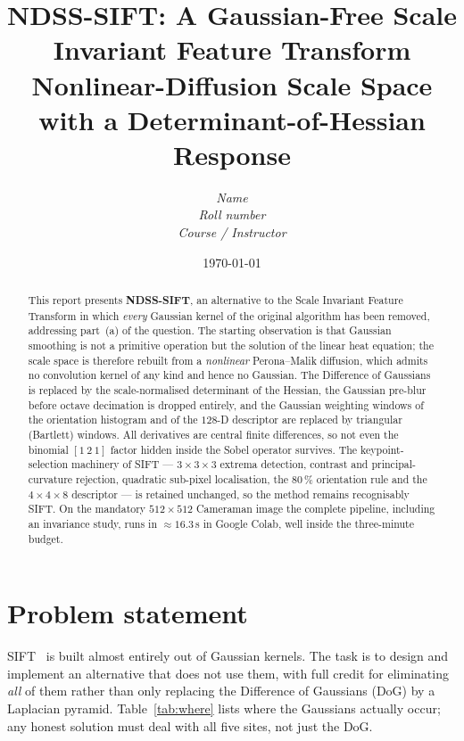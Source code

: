 \documentclass[11pt,a4paper]{article}
\title{\bfseries NDSS-SIFT: A Gaussian-Free Scale Invariant Feature Transform\\[2mm]
\large Nonlinear-Diffusion Scale Space with a Determinant-of-Hessian Response}
\author{\textit{Name} \\ \textit{Roll number} \\ \textit{Course / Instructor}}
\date{\today}
\newcommand{\Truntime}{16.3}      %
\begin{document}
\maketitle

\begin{abstract}
\noindent
This report presents \textbf{NDSS-SIFT}, an alternative to the Scale Invariant
Feature Transform in which \emph{every} Gaussian kernel of the original
algorithm has been removed, addressing part~(a) of the question. The starting
observation is that Gaussian smoothing is not a primitive operation but the
solution of the linear heat equation; the scale space is therefore rebuilt from
a \emph{nonlinear} Perona--Malik diffusion, which admits no convolution kernel
of any kind and hence no Gaussian. The Difference of Gaussians is replaced by
the scale-normalised determinant of the Hessian, the Gaussian pre-blur before
octave decimation is dropped entirely, and the Gaussian weighting windows of
the orientation histogram and of the $128$-D descriptor are replaced by
triangular (Bartlett) windows. All derivatives are central finite differences,
so not even the binomial $[1\ 2\ 1]$ factor hidden inside the Sobel operator
survives. The keypoint-selection machinery of SIFT --- $3\!\times\!3\!\times\!3$
extrema detection, contrast and principal-curvature rejection, quadratic
sub-pixel localisation, the $80\,\%$ orientation rule and the
$4\!\times\!4\!\times\!8$ descriptor --- is retained unchanged, so the method
remains recognisably SIFT. On the mandatory $512\times512$ Cameraman image the
complete pipeline, including an invariance study, runs in
$\approx\Truntime$\,s in Google Colab, well inside the three-minute budget.
\end{abstract}

\section{Problem statement}

SIFT~\cite{lowe2004} is built almost entirely out of Gaussian kernels. The task
is to design and implement an alternative that does not use them, with full
credit for eliminating \emph{all} of them rather than only replacing the
Difference of Gaussians (DoG) by a Laplacian pyramid. Table~\ref{tab:where}
lists where the Gaussians actually occur; any honest solution must deal with
all five sites, not just the DoG.
\end{document}
